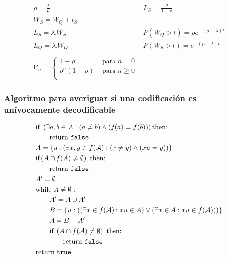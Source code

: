 \documentclass{article}
\begin{document}
$$
\begin{matrix}
\rho=\frac{\lambda}{\mu} & L_S=\frac{\rho}{1-\rho}\\
W_S = W_Q + t_S & \\
L_S=\lambda.W_S& P(W_Q>t)=\rho e^{-\left(\mu-\lambda\right)t}\\
L_Q=\lambda.W_Q& P(W_S>t)=e^{-\left(\mu-\lambda\right)t}\\
&\\
\text{P}_n=\begin{cases}1-\rho & \text{ para } n=0\\\rho^n(1-\rho) & \text{ para } n\geq 0\\\end{cases}
\end{matrix}
$$

\subsubsection*{\centering Algoritmo para averiguar si una codificación es unívocamente decodificable}

\begin{align*}
    &\text{if }\left(\exists a,b\in\mathcal{A}: (a\neq b)\wedge(f(a)=f(b))\right)\text{then:}\\
    &\quad\quad\text{return \texttt{false}}\\
    &A=\left\{u: \left(\exists x,y\in f(\mathcal{A}):(x\neq y)\wedge (xu=y)\right)\right\}\\
    &\text{if}\left(A\cap f(A)\neq\emptyset\right)\text{ then:}\\
    &\quad\quad\text{return \texttt{false}}\\
    &A'=\emptyset\\
    &\text{while }A\neq\emptyset:\\
    &\quad\quad A'=A\cup A'\\
    &\quad\quad B = \left\{u:\left(\left(\exists x\in f(\mathcal{A}): xu\in A\right)\vee\left(\exists x\in A: xu\in f(\mathcal{A})\right)\right)\right\}\\
    &\quad\quad A = B - A'\\
    &\quad\quad\text{if }\left(A\cap f(\mathcal{A})\neq\emptyset\right)\text{ then:}\\
    &\quad\quad\quad\quad\text{return \texttt{false}}\\
    &\text{return \texttt{true}}\\
\end{align*}

\end{document}
